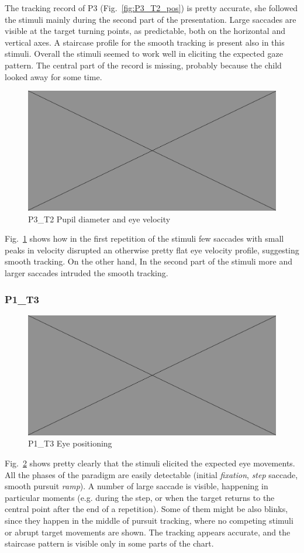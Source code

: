 The tracking record of P3 (Fig.~\ref{fig:P3_T2_pos}) is pretty accurate, she followed the stimuli mainly during the second part of the presentation. Large saccades are visible at the target turning points, as predictable, both on the horizontal and vertical axes. A staircase profile for the smooth tracking is present also in this stimuli. Overall the stimuli seemed to work  well in eliciting the expected gaze pattern. The central part of the record is missing, probably because the child looked away for some time.

\begin{figure}[h]
  \centering
  \includegraphics[width=.5\textwidth]{figures/placeholderImg.jpg}
  \caption[P3\_T2 pupil velocity]{P3\_T2 Pupil diameter and eye velocity}
  \label{fig:P3_T2_vel}
\end{figure}

Fig.~\ref{fig:P3_T2_vel} shows how in the first repetition of the stimuli few saccades with small peaks in velocity disrupted an otherwise pretty flat eye velocity profile, suggesting smooth tracking. On the other hand, In the second part of the stimuli more and larger saccades intruded the smooth tracking.



\subsubsection{P1\_T3}
\label{sec:P1_T3}

\begin{figure}[h]
  \centering
  \includegraphics[width=.5\textwidth]{figures/placeholderImg.jpg}
  \caption[P1\_T3 Eye positioning]{P1\_T3 Eye positioning}
  \label{fig:P1_T3_pos}
\end{figure}

Fig.~\ref{fig:P1_T3_pos} shows pretty clearly that the stimuli elicited the expected eye movements. All the phases of the paradigm are easily detectable (initial \textit{fixation}, \textit{step} saccade, smooth pursuit \textit{ramp}). A number of large saccade is visible, happening in particular moments (e.g. during the step, or when the target returns to the central point after the end of a repetition). Some of them might be also blinks, since they happen in the middle of pursuit tracking, where no competing stimuli or abrupt target movements are shown. The tracking appears accurate, and the staircase pattern is visible only in some parts of the chart.

